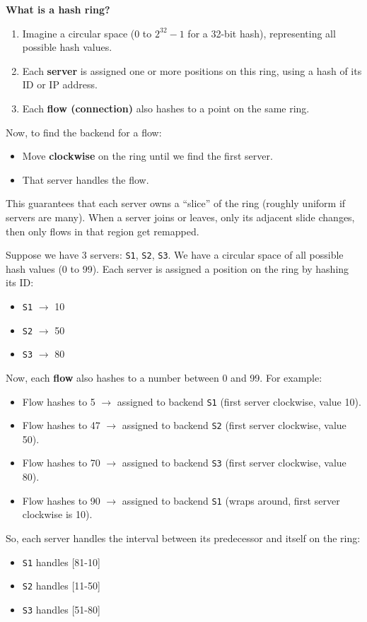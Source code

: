 \highspace
\textcolor{Green3}{ \textbf{What is a hash ring?}}
\begin{enumerate}
    \item Imagine a circular space (0 to $2^{32}-1$ for a 32-bit hash), representing all possible hash values.
    \item Each \textbf{server} is assigned one or more positions on this ring, using a hash of its ID or IP address.
    \item Each \textbf{flow (connection)} also hashes to a point on the same ring.
\end{enumerate}
Now, to find the backend for a flow:
\begin{itemize}
    \item Move \textbf{clockwise} on the ring until we find the first server.
    \item That server handles the flow.
\end{itemize}
This guarantees that each server owns a ``slice'' of the ring (roughly uniform if servers are many). When a server joins or leaves, only its adjacent slide changes, then only flows in that region get remapped.

\begin{examplebox}
    Suppose we have 3 servers: \texttt{S1}, \texttt{S2}, \texttt{S3}. We have a circular space of all possible hash values (0 to 99). Each server is assigned a position on the ring by hashing its ID:
    \begin{itemize}
        \item \texttt{S1} $\rightarrow$ 10
        \item \texttt{S2} $\rightarrow$ 50
        \item \texttt{S3} $\rightarrow$ 80
    \end{itemize}
    Now, each \textbf{flow} also hashes to a number between 0 and 99. For example:
    \begin{itemize}
        \item Flow  hashes to 5 $\rightarrow$ assigned to backend \texttt{S1} (first server clockwise, value 10).
        \item Flow  hashes to 47 $\rightarrow$ assigned to backend \texttt{S2} (first server clockwise, value 50).
        \item Flow  hashes to 70 $\rightarrow$ assigned to backend \texttt{S3} (first server clockwise, value 80).
        \item Flow  hashes to 90 $\rightarrow$ assigned to backend \texttt{S1} (wraps around, first server clockwise is 10).
    \end{itemize}
    So, each server handles the interval between its predecessor and itself on the ring:
    \begin{itemize}
        \item \texttt{S1} handles [81-10]
        \item \texttt{S2} handles [11-50]
        \item \texttt{S3} handles [51-80]
    \end{itemize}
\end{examplebox}

